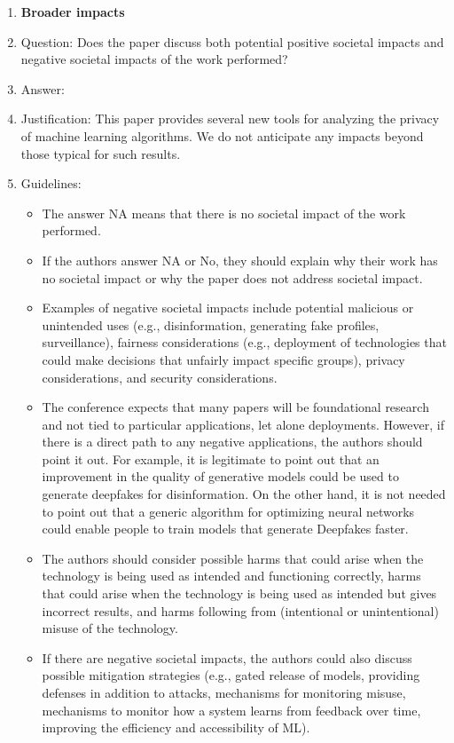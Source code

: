 \documentclass{article}
\theoremstyle{plain}
\theoremstyle{definition}
\begin{document}
\begin{enumerate}
\newpage
\item {\bf Broader impacts}
    \item[] Question: Does the paper discuss both potential positive societal impacts and negative societal impacts of the work performed?
    \item[] Answer: \answerYes{}
    \item[] Justification: This paper provides several new tools for analyzing the privacy of machine learning algorithms. We do not anticipate any impacts beyond those typical for such results.
    \item[] Guidelines:
    \begin{itemize}
        \item The answer NA means that there is no societal impact of the work performed.
        \item If the authors answer NA or No, they should explain why their work has no societal impact or why the paper does not address societal impact.
        \item Examples of negative societal impacts include potential malicious or unintended uses (e.g., disinformation, generating fake profiles, surveillance), fairness considerations (e.g., deployment of technologies that could make decisions that unfairly impact specific groups), privacy considerations, and security considerations.
        \item The conference expects that many papers will be foundational research and not tied to particular applications, let alone deployments. However, if there is a direct path to any negative applications, the authors should point it out. For example, it is legitimate to point out that an improvement in the quality of generative models could be used to generate deepfakes for disinformation. On the other hand, it is not needed to point out that a generic algorithm for optimizing neural networks could enable people to train models that generate Deepfakes faster.
        \item The authors should consider possible harms that could arise when the technology is being used as intended and functioning correctly, harms that could arise when the technology is being used as intended but gives incorrect results, and harms following from (intentional or unintentional) misuse of the technology.
        \item If there are negative societal impacts, the authors could also discuss possible mitigation strategies (e.g., gated release of models, providing defenses in addition to attacks, mechanisms for monitoring misuse, mechanisms to monitor how a system learns from feedback over time, improving the efficiency and accessibility of ML).
    \end{itemize}
    

\end{enumerate}
\end{document}

